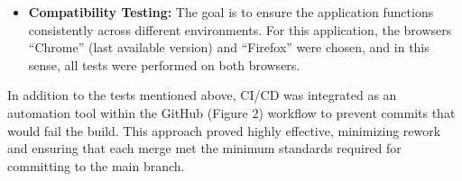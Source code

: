 \begin{itemize}
    \item \textbf{Compatibility Testing:} The goal is to ensure the application functions consistently across different environments. For this application, the browsers “Chrome” (last available version) and “Firefox” were chosen, and in this sense, all tests were performed on both browsers.
\end{itemize}

In addition to the tests mentioned above, CI/CD was integrated as an automation tool within the GitHub (Figure 2) workflow to prevent commits that would fail the build. This approach proved highly effective, minimizing rework and ensuring that each merge met the minimum standards required for committing to the main branch.




